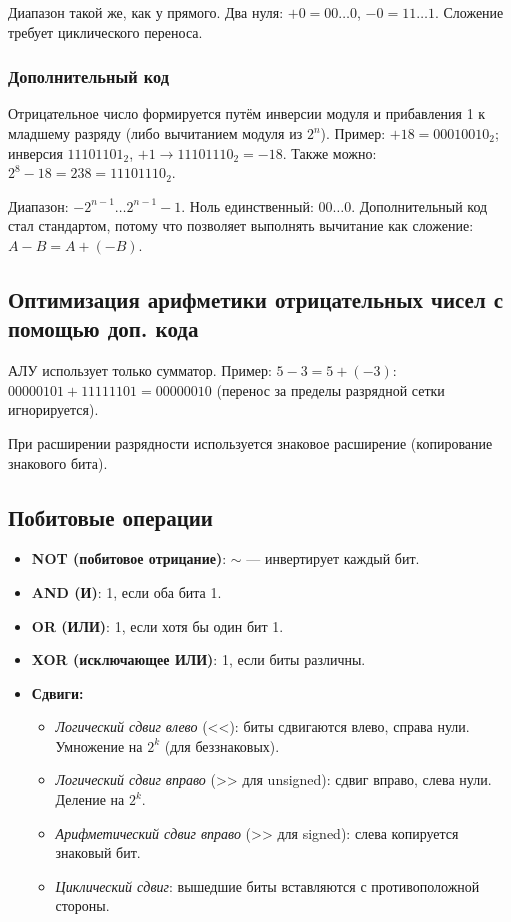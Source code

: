\documentclass[a4paper,14pt]{report}
\begin{document}
Диапазон такой же, как у прямого. Два нуля: $+0 = 00\dots0$, $-0 = 11\dots1$. Сложение требует циклического переноса.

\subsubsection{Дополнительный код}
Отрицательное число формируется путём инверсии модуля и прибавления 1 к младшему разряду (либо вычитанием модуля из $2^n$).
Пример: $+18 = 00010010_2$; инверсия $11101101_2$, $+1 \to 11101110_2 = -18$. Также можно: $2^8 - 18 = 238 = 11101110_2$.

Диапазон: $-2^{n-1} \dots 2^{n-1}-1$. Ноль единственный: $00\dots0$. Дополнительный код стал стандартом, потому что позволяет выполнять вычитание как сложение: $A - B = A + (-B)$.

\subsection{Оптимизация арифметики отрицательных чисел с помощью доп. кода}
АЛУ использует только сумматор. Пример: $5 - 3 = 5 + (-3)$: $00000101 + 11111101 = 00000010$ (перенос за пределы разрядной сетки игнорируется).

При расширении разрядности используется знаковое расширение (копирование знакового бита).

\subsection{Побитовые операции}
\begin{itemize}
    \item \textbf{NOT (побитовое отрицание)}: $\sim$ — инвертирует каждый бит.
    \item \textbf{AND (И)}: 1, если оба бита 1.
    \item \textbf{OR (ИЛИ)}: 1, если хотя бы один бит 1.
    \item \textbf{XOR (исключающее ИЛИ)}: 1, если биты различны.
    \item \textbf{Сдвиги:}
    \begin{itemize}
        \item \textit{Логический сдвиг влево} (<<): биты сдвигаются влево, справа нули. Умножение на $2^k$ (для беззнаковых).
        \item \textit{Логический сдвиг вправо} (>> для unsigned): сдвиг вправо, слева нули. Деление на $2^k$.
        \item \textit{Арифметический сдвиг вправо} (>> для signed): слева копируется знаковый бит.
        \item \textit{Циклический сдвиг}: вышедшие биты вставляются с противоположной стороны.
    \end{itemize}
\end{itemize}
\end{document}

